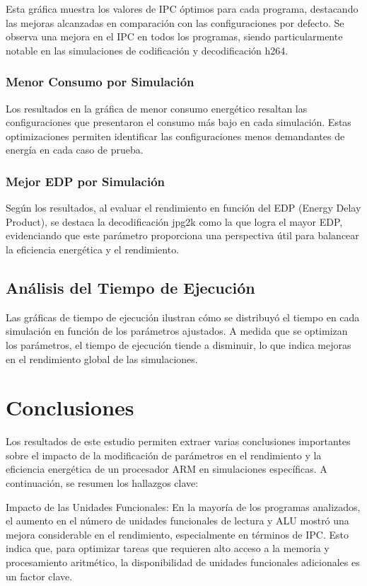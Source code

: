 \documentclass[conference]{IEEEtran}
\begin{document}
Esta gráfica muestra los valores de IPC óptimos para cada programa, destacando las mejoras alcanzadas en comparación con las configuraciones por defecto. Se observa una mejora en el IPC en todos los programas, siendo particularmente notable en las simulaciones de codificación y decodificación h264.

\subsubsection{Menor Consumo por Simulación}

Los resultados en la gráfica de menor consumo energético resaltan las configuraciones que presentaron el consumo más bajo en cada simulación. Estas optimizaciones permiten identificar las configuraciones menos demandantes de energía en cada caso de prueba.

\subsubsection{Mejor EDP por Simulación}

Según los resultados, al evaluar el rendimiento en función del EDP (Energy Delay Product), se destaca la decodificación jpg2k como la que logra el mayor EDP, evidenciando que este parámetro proporciona una perspectiva útil para balancear la eficiencia energética y el rendimiento.

\subsection{Análisis del Tiempo de Ejecución}

Las gráficas de tiempo de ejecución ilustran cómo se distribuyó el tiempo en cada simulación en función de los parámetros ajustados. A medida que se optimizan los parámetros, el tiempo de ejecución tiende a disminuir, lo que indica mejoras en el rendimiento global de las simulaciones.

\section{Conclusiones}

Los resultados de este estudio permiten extraer varias conclusiones importantes sobre el impacto de la modificación de parámetros en el rendimiento y la eficiencia energética de un procesador ARM en simulaciones específicas. A continuación, se resumen los hallazgos clave:

Impacto de las Unidades Funcionales: En la mayoría de los programas analizados, el aumento en el número de unidades funcionales de lectura y ALU mostró una mejora considerable en el rendimiento, especialmente en términos de IPC. Esto indica que, para optimizar tareas que requieren alto acceso a la memoria y procesamiento aritmético, la disponibilidad de unidades funcionales adicionales es un factor clave.
\end{document}
